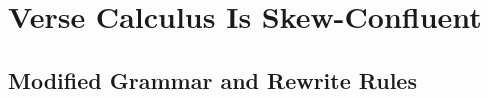 



















































\section{Verse Calculus Is Skew-Confluent}


\subsection{Modified Grammar and Rewrite Rules}

